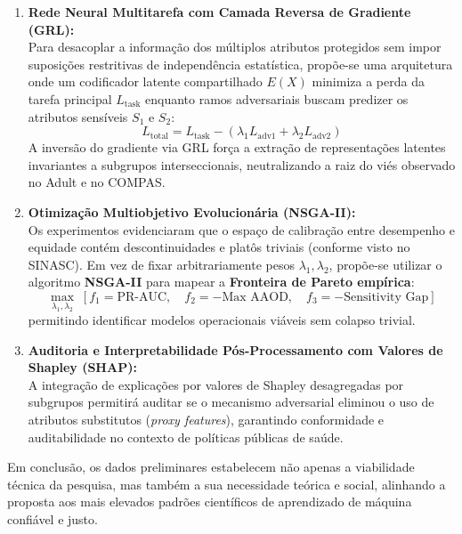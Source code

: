\begin{enumerate}
    \item \textbf{Rede Neural Multitarefa com Camada Reversa de Gradiente (GRL):} \\
    Para desacoplar a informação dos múltiplos atributos protegidos sem impor suposições restritivas de independência estatística, propõe-se uma arquitetura onde um codificador latente compartilhado $E(X)$ minimiza a perda da tarefa principal $L_{\text{task}}$ enquanto ramos adversariais buscam predizer os atributos sensíveis $S_1$ e $S_2$:
    \begin{equation}
    L_{\text{total}} = L_{\text{task}} - \left( \lambda_1 L_{\text{adv1}} + \lambda_2 L_{\text{adv2}} \right)
    \end{equation}
    A inversão do gradiente via GRL força a extração de representações latentes invariantes a subgrupos interseccionais, neutralizando a raiz do viés observado no Adult e no COMPAS.

    \item \textbf{Otimização Multiobjetivo Evolucionária (NSGA-II):} \\
    Os experimentos evidenciaram que o espaço de calibração entre desempenho e equidade contém descontinuidades e platôs triviais (conforme visto no SINASC). Em vez de fixar arbitrariamente pesos $\lambda_1, \lambda_2$, propõe-se utilizar o algoritmo \textbf{NSGA-II} \cite{deb2002fast} para mapear a \textbf{Fronteira de Pareto empírica}:
    \begin{equation}
    \max_{\lambda_1, \lambda_2} \; \left[ f_1 = \text{PR-AUC}, \quad f_2 = -\text{Max AAOD}, \quad f_3 = -\text{Sensitivity Gap} \right]
    \end{equation}
    permitindo identificar modelos operacionais viáveis sem colapso trivial.

    \item \textbf{Auditoria e Interpretabilidade Pós-Processamento com Valores de Shapley (SHAP):} \\
    A integração de explicações por valores de Shapley desagregadas por subgrupos \cite{lundberg2017unified} permitirá auditar se o mecanismo adversarial eliminou o uso de atributos substitutos (\textit{proxy features}), garantindo conformidade e auditabilidade no contexto de políticas públicas de saúde.
\end{enumerate}

Em conclusão, os dados preliminares estabelecem não apenas a viabilidade técnica da pesquisa, mas também a sua necessidade teórica e social, alinhando a proposta aos mais elevados padrões científicos de aprendizado de máquina confiável e justo.
